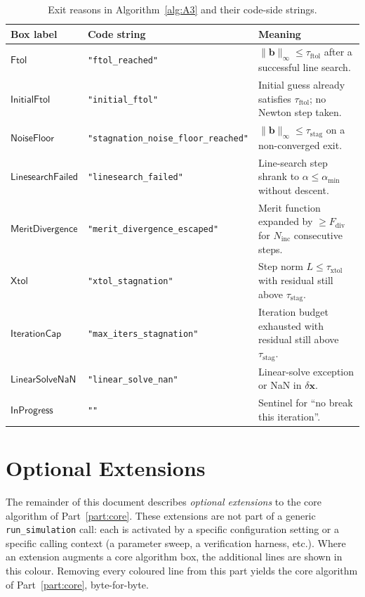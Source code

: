 \documentclass{article}
\newcommand{\code}[1]{\texttt{\small #1}}
\newcommand{\textftol}{\tau_{\mathrm{ftol}}}
\newcommand{\textstag}{\tau_{\mathrm{stag}}}
\newcommand{\textxtol}{\tau_{\mathrm{xtol}}}
\newcommand{\extline}[1]{{\color{extcolor}#1}}
\begin{document}
\begin{table}[h]
\centering
\caption{Exit reasons in Algorithm~\ref{alg:A3} and their code-side strings.}
\label{tab:reasons}
\small
\begin{tabularx}{\textwidth}{@{} l l X @{}}
\toprule
\textbf{Box label} & \textbf{Code string} & \textbf{Meaning} \\
\midrule
$\mathsf{Ftol}$               & \code{"ftol\_reached"}                 & $\|\boldsymbol{b}\|_\infty \le \textftol$ after a successful line search. \\
$\mathsf{InitialFtol}$        & \code{"initial\_ftol"}                  & Initial guess already satisfies $\textftol$; no Newton step taken. \\
$\mathsf{NoiseFloor}$         & \code{"stagnation\_noise\_floor\_reached"} & $\|\boldsymbol{b}\|_\infty \le \textstag$ on a non-converged exit. \\
$\mathsf{LinesearchFailed}$   & \code{"linesearch\_failed"}             & Line-search step shrank to $\alpha \le \alpha_{\min}$ without descent. \\
$\mathsf{MeritDivergence}$    & \code{"merit\_divergence\_escaped"}     & Merit function expanded by $\ge F_{\mathrm{div}}$ for $N_{\mathrm{inc}}$ consecutive steps. \\
$\mathsf{Xtol}$               & \code{"xtol\_stagnation"}               & Step norm $L \le \textxtol$ with residual still above $\textstag$. \\
$\mathsf{IterationCap}$       & \code{"max\_iters\_stagnation"}         & Iteration budget exhausted with residual still above $\textstag$. \\
$\mathsf{LinearSolveNaN}$     & \code{"linear\_solve\_nan"}             & Linear-solve exception or NaN in $\delta\boldsymbol{x}$. \\
$\mathsf{InProgress}$         & \code{""}                                & Sentinel for ``no break this iteration''. \\
\bottomrule
\end{tabularx}
\end{table}

\part{Optional Extensions}
\label{part:ext}

\begin{tcolorbox}[colback=extcolor!5!white, colframe=extcolor, boxrule=0.5pt, arc=2pt, left=6pt, right=6pt, top=4pt, bottom=4pt]
\small
\extline{The remainder of this document describes \emph{optional extensions}
to the core algorithm of Part~\ref{part:core}. These extensions are not
part of a generic \code{run\_simulation} call: each is activated by a
specific configuration setting or a specific calling context (a
parameter sweep, a verification harness, etc.). Where an extension
augments a core algorithm box, the additional lines are shown in this
colour. Removing every \extline{coloured} line from this part yields
the core algorithm of Part~\ref{part:core}, byte-for-byte.}
\end{tcolorbox}
\end{document}
